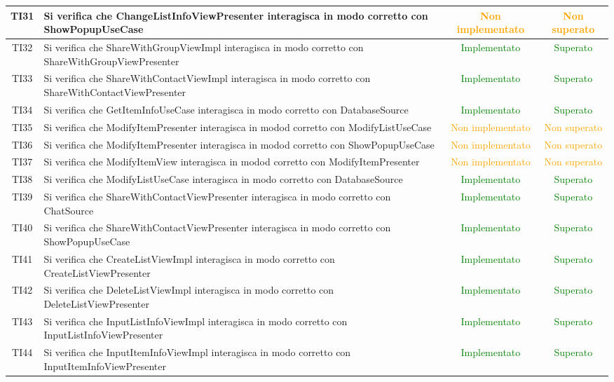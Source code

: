 \begin{center}
\begin{longtable}{|c|>{\centering}m{10cm}|c|c|}
		TI31 & Si verifica che ChangeListInfoViewPresenter interagisca in modo corretto con ShowPopupUseCase & \textcolor{Orange}{Non implementato} & \textcolor{Orange}{Non superato} \\ \hline
		TI32 & Si verifica che ShareWithGroupViewImpl interagisca in modo corretto con ShareWithGroupViewPresenter & \textcolor{Green}{Implementato} & \textcolor{Green}{Superato} \\ \hline
		TI33 & Si verifica che ShareWithContactViewImpl interagisca in modo corretto con ShareWithContactViewPresenter & \textcolor{Green}{Implementato} & \textcolor{Green}{Superato} \\ \hline
		TI34 & Si verifica che GetItemInfoUseCase interagisca in modo corretto con DatabaseSource & \textcolor{Green}{Implementato} & \textcolor{Green}{Superato} \\ \hline
		TI35 & Si verifica che ModifyItemPresenter interagisca in modod corretto con ModifyListUseCase & \textcolor{Orange}{Non implementato} & \textcolor{Orange}{Non superato} \\ \hline
		TI36 & Si verifica che ModifyItemPresenter interagisca in modod corretto con ShowPopupUseCase & \textcolor{Orange}{Non implementato} & \textcolor{Orange}{Non superato} \\ \hline
		TI37 & Si verifica che ModifyItemView interagisca in modod corretto con ModifyItemPresenter & \textcolor{Orange}{Non implementato} & \textcolor{Orange}{Non superato} \\ \hline
		TI38 & Si verifica che ModifyListUseCase interagisca in modo corretto con DatabaseSource & \textcolor{Green}{Implementato} & \textcolor{Green}{Superato} \\ \hline
		TI39 & Si verifica che ShareWithContactViewPresenter interagisca in modo corretto con ChatSource & \textcolor{Green}{Implementato} & \textcolor{Green}{Superato} \\ \hline
		TI40 & Si verifica che ShareWithContactViewPresenter interagisca in modo corretto con ShowPopupUseCase & \textcolor{Green}{Implementato} & \textcolor{Green}{Superato} \\ \hline
		TI41 & Si verifica che CreateListViewImpl interagisca in modo corretto con CreateListViewPresenter & \textcolor{Green}{Implementato} & \textcolor{Green}{Superato} \\ \hline
		TI42 & Si verifica che DeleteListViewImpl interagisca in modo corretto con DeleteListViewPresenter & \textcolor{Green}{Implementato} & \textcolor{Green}{Superato} \\ \hline
		TI43 & Si verifica che InputListInfoViewImpl interagisca in modo corretto con InputListInfoViewPresenter & \textcolor{Green}{Implementato} & \textcolor{Green}{Superato} \\ \hline
		TI44 & Si verifica che InputItemInfoViewImpl interagisca in modo corretto con InputItemInfoViewPresenter & \textcolor{Green}{Implementato} & \textcolor{Green}{Superato} \\ \hline
	\end{longtable}
\end{center}
